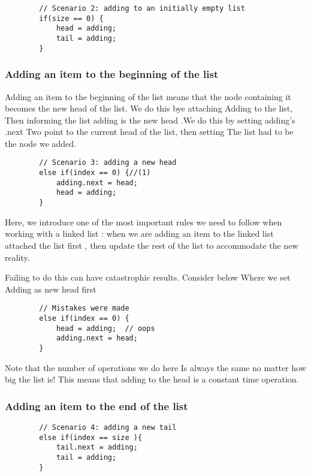 	\begin{verbatim}
		// Scenario 2: adding to an initially empty list
		if(size == 0) {
			head = adding;
			tail = adding;
		}	
	\end{verbatim}
	
	
	
	\subsubsection{Adding an item to the beginning of the list}
	Adding an item to the beginning of the list means that the node containing it becomes the new head of the list.  We do this bye attaching Adding to the list, Then informing the list adding is the new head .We do this by setting adding's .next Two point to the current head of the list, then setting The list had to be the node we added.
	
	\begin{verbatim}
		// Scenario 3: adding a new head
		else if(index == 0) {//(1)
			adding.next = head;
			head = adding;
		}
	\end{verbatim}
	
	
	
	Here, we introduce one of the most important rules we need to follow when working with a linked list : when we are adding an item to the linked list attached the list first , then update the rest of the list to accommodate the new reality.
	
	Failing to do this can have catastrophic results.  Consider below Where we set Adding as new head first 
	
	
	
	\begin{verbatim}
		// Mistakes were made
		else if(index == 0) {
			head = adding;  // oops
			adding.next = head;
		}
	\end{verbatim}
	
	
	
	
	Note that the number of operations we do here Is always the same no matter how big the list is!  This means that adding to the head is a constant time operation.
	
	\subsubsection{Adding an item to the end of the list}
	\begin{verbatim}
		// Scenario 4: adding a new tail
		else if(index == size ){
			tail.next = adding;
			tail = adding;
		}
	\end{verbatim}
	
